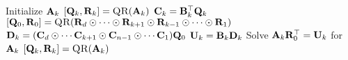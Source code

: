 
\begin{algorithmic}[1]
        \State Initialize $\mathbf{A}_k$
        \State $[\mat{Q}_k,\mat{R}_k] = \Call{QR}{\mat{A}_k}$ 
        \State $\mathbf{C}_k = \mathbf{B}_k^\top\mathbf{Q}_k$  \label{l:EXP-K-Apply} 
      \EndFor
          \State $[\mat{Q}_0,\mat{R}_0] = \Call{QR}{\mat{R}_d \odot \cdots \odot \mat{R}_{k+1} \odot \mat{R}_{k-1} \odot \cdots \odot \mat{R}_1}$ 
          \State $\mathbf{D}_k = (\mathbf{C}_d \odot \cdots \mathbf{C}_{k+1} \odot \mathbf{C}_{n-1} \odot \cdots \mathbf{C}_1)\mathbf{Q}_0$ 
          \State $\mathbf{U}_k = \mathbf{B}_k\mathbf{D}_k$ 
          \State Solve $\mathbf{A}_k\mathbf{R}_0^\top = \mathbf{U}_k$ for $\mathbf{A}_k$ 
          \State $[\mat{Q}_k,\mat{R}_k] = \Call{QR}{\mat{A}_k}$      
        \EndFor
      \EndWhile
    \EndFunction
  \end{algorithmic}